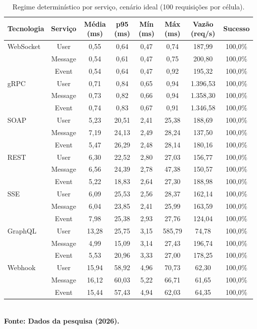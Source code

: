 \begin{table}[H]
\centering
\scriptsize
\caption{Regime determinístico por serviço, cenário ideal (100 requisições por célula).}
\label{tab:det_srv_ideal}
\begin{tabular}{|l|c|c|c|c|c|c|c|}
\hline
\textbf{Tecnologia} & \textbf{Serviço} & \textbf{Média (ms)} & \textbf{p95 (ms)} & \textbf{Mín (ms)} & \textbf{Máx (ms)} & \textbf{Vazão (req/s)} & \textbf{Sucesso} \\ \hline
WebSocket & User & 0,55 & 0,64 & 0,47 & 0,74 & 187,99 & 100,0\% \\ \hline
 & Message & 0,54 & 0,61 & 0,47 & 0,75 & 200,80 & 100,0\% \\ \hline
 & Event & 0,54 & 0,64 & 0,47 & 0,92 & 195,32 & 100,0\% \\ \hline
gRPC & User & 0,71 & 0,84 & 0,65 & 0,94 & 1.396,53 & 100,0\% \\ \hline
 & Message & 0,73 & 0,82 & 0,66 & 0,94 & 1.358,30 & 100,0\% \\ \hline
 & Event & 0,74 & 0,83 & 0,67 & 0,91 & 1.346,58 & 100,0\% \\ \hline
SOAP & User & 5,23 & 20,51 & 2,41 & 25,38 & 188,69 & 100,0\% \\ \hline
 & Message & 7,19 & 24,13 & 2,49 & 28,24 & 137,50 & 100,0\% \\ \hline
 & Event & 5,47 & 26,29 & 2,48 & 28,14 & 180,16 & 100,0\% \\ \hline
REST & User & 6,30 & 22,52 & 2,80 & 27,03 & 156,77 & 100,0\% \\ \hline
 & Message & 6,56 & 24,39 & 2,78 & 47,38 & 150,57 & 100,0\% \\ \hline
 & Event & 5,22 & 18,83 & 2,64 & 27,30 & 188,98 & 100,0\% \\ \hline
SSE & User & 6,09 & 25,53 & 2,56 & 28,37 & 162,14 & 100,0\% \\ \hline
 & Message & 6,04 & 23,85 & 2,41 & 25,99 & 163,59 & 100,0\% \\ \hline
 & Event & 7,98 & 25,38 & 2,93 & 27,76 & 124,04 & 100,0\% \\ \hline
GraphQL & User & 13,28 & 25,75 & 3,15 & 585,79 & 74,78 & 100,0\% \\ \hline
 & Message & 4,99 & 15,09 & 3,14 & 27,43 & 196,74 & 100,0\% \\ \hline
 & Event & 5,53 & 20,96 & 3,33 & 27,00 & 178,25 & 100,0\% \\ \hline
Webhook & User & 15,94 & 58,92 & 4,96 & 70,73 & 62,30 & 100,0\% \\ \hline
 & Message & 16,12 & 60,03 & 5,22 & 66,71 & 61,65 & 100,0\% \\ \hline
 & Event & 15,44 & 57,43 & 4,94 & 62,03 & 64,35 & 100,0\% \\ \hline
\end{tabular}
{\footnotesize\\ \textbf{Fonte: Dados da pesquisa (2026).}}
\end{table}
